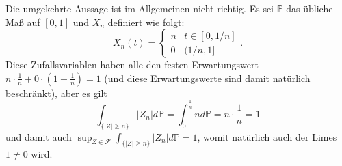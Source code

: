 \documentclass[a4paper]{article}
\begin{document}
Die umgekehrte Aussage ist im Allgemeinen nicht richtig. Es sei $\mathds{P}$ das übliche Maß auf $[0,1]$ und $X_n$ definiert wie folgt:
\begin{equation*}
    X_n(t) = \left\{ \begin{matrix}
        n & t \in [0, 1/n]\\ 0 & (1/n, 1]
    \end{matrix} \right.\text{.}
\end{equation*}
Diese Zufallsvariablen haben alle den festen Erwartungswert $n \cdot \frac{1}{n} + 0 \cdot (1 - \frac{1}{n}) = 1$ (und diese Erwartungswerte sind damit natürlich beschränkt), aber es gilt 
\begin{equation*}
    \int_{\{|Z|\geq n\}} |Z_n| d\mathds{P} = \int_0^\frac{1}{n} n d \mathds{P} = n \cdot \frac{1}{n} = 1
\end{equation*}
und damit auch $\sup_{Z \in \mathcal{F}} \int_{\{|Z|\geq n\}} |Z_n| d\mathds{P} = 1$, womit natürlich auch der Limes $1 \neq 0$ wird.


\subsection{}
\end{document}
